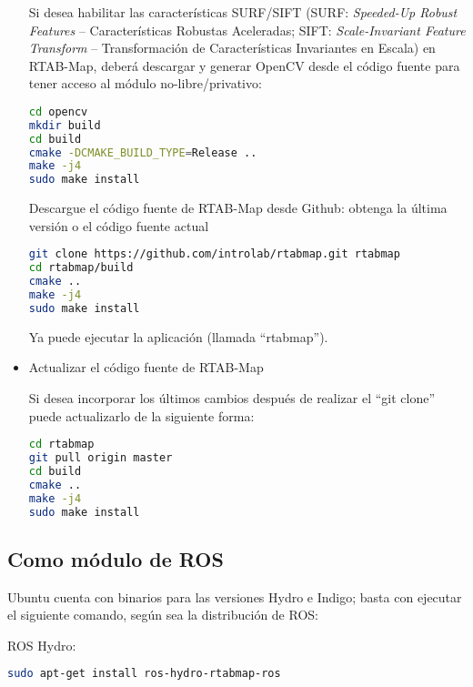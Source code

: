 \begin{itemize}
	Si desea habilitar las características SURF/SIFT (SURF: \textit{Speeded-Up Robust Features} -- Características Robustas Aceleradas; SIFT: \textit{Scale-Invariant Feature Transform} -- Transformación de Características Invariantes en Escala) en RTAB-Map, deberá descargar y generar OpenCV desde el código fuente para tener acceso al módulo no-libre/privativo:
	\begin{blackcodebox}
	\begin{lstlisting}[language=bash]
cd opencv
mkdir build
cd build
cmake -DCMAKE_BUILD_TYPE=Release ..
make -j4
sudo make install
	\end{lstlisting}
	\end{blackcodebox}

	Descargue el código fuente de RTAB-Map desde Github: obtenga la última versión o el código fuente actual
	\begin{blackcodebox}
	\begin{lstlisting}[language=bash]
git clone https://github.com/introlab/rtabmap.git rtabmap
cd rtabmap/build
cmake ..
make -j4
sudo make install
	\end{lstlisting}
	\end{blackcodebox}

	Ya puede ejecutar la aplicación (llamada ``rtabmap'').

	\item Actualizar el código fuente de RTAB-Map

	Si desea incorporar los últimos cambios después de realizar el ``git clone'' puede actualizarlo de la siguiente forma:
	\begin{blackcodebox}
	\begin{lstlisting}[language=bash]
cd rtabmap
git pull origin master
cd build
cmake ..
make -j4
sudo make install
	\end{lstlisting}
	\end{blackcodebox}
\end{itemize}

\subsection{Como módulo de ROS}

Ubuntu cuenta con binarios para las versiones Hydro e Indigo; basta con ejecutar el siguiente comando, según sea la distribución de ROS:

\noindent ROS Hydro:
\begin{blackcodebox}
\begin{lstlisting}[language=bash]
sudo apt-get install ros-hydro-rtabmap-ros
\end{lstlisting}
\end{blackcodebox}

